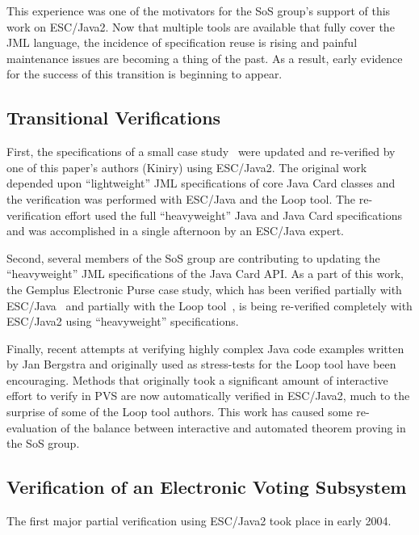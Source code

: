 \documentclass{llncs}
\begin{document}
This experience was one of the motivators for the SoS group's support
of this work on ESC/Java2.  Now that multiple tools are available that
fully cover the JML language, the incidence of specification reuse is
rising and painful maintenance issues are becoming a thing of the
past.  As a result, early evidence for the success of this transition
is beginning to appear.

\subsection{Transitional Verifications}

First, the specifications of a small case
study~\cite{BreunesseJacobsBerg02} were updated and re-verified by one
of this paper's authors (Kiniry) using ESC/Java2.  The original work
depended upon ``light\-weight'' JML specifications of core Java Card
classes and the verification was performed with ESC/Java and
the Loop tool.  The re-verification effort used the full
``heavyweight'' Java and Java Card specifications and was accomplished
in a single afternoon by an ESC/Java expert.

Second, several members of the SoS group are contributing to updating
the ``heavyweight'' JML specifications of the Java Card API.  As a
part of this work, the Gemplus Electronic Purse case study, which has
been verified partially with ESC/Java~\cite{CatanoHuisman02} and
partially with the Loop tool~\cite{BreunesseJacobsBerg02}, is being
re-verified completely with ESC/Java2 using ``heavyweight''
specifications.

Finally, recent attempts at verifying highly complex Java code
examples written by Jan Bergstra and originally used as stress-tests
for the Loop tool have been encouraging.  Methods that originally took
a significant amount of interactive effort to verify in PVS are now
automatically verified in ESC/Java2, much to the surprise of some of
the Loop tool authors.  This work has caused some re-evaluation of the
balance between interactive and automated theorem proving in the SoS
group.

\subsection{Verification of an Electronic Voting Subsystem}

The first major partial verification using ESC/Java2 took place in
early 2004.
\end{document}
